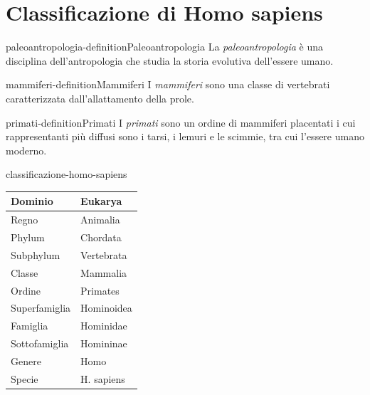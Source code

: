 \documentclass[preview]{standalone}
\begin{document}
\genpage

\section{Classificazione di Homo sapiens}

\begin{snippetdefinition}{paleoantropologia-definition}{Paleoantropologia}
    La \textit{paleoantropologia} è una disciplina dell'antropologia che studia la storia evolutiva
    dell'essere umano.
\end{snippetdefinition}

\begin{snippetdefinition}{mammiferi-definition}{Mammiferi}
    I \textit{mammiferi} sono una classe di vertebrati caratterizzata dall'allattamento della prole. 
\end{snippetdefinition}

\begin{snippetdefinition}{primati-definition}{Primati}
    I \textit{primati} sono un ordine di mammiferi placentati i cui rappresentanti
    più diffusi sono i tarsi, i lemuri e le scimmie, tra cui l'essere umano moderno. 
\end{snippetdefinition}


\begin{snippet}{classificazione-homo-sapiens}
    \vspace{0.25cm}
    \begin{center}
        \begin{tabular}{|l|l|}
            \hline Dominio & Eukarya \\
            \hline Regno & Animalia \\
            \hline Phylum & Chordata \\
            \hline Subphylum & Vertebrata \\
            \hline Classe & Mammalia \\
            \hline Ordine & Primates \\
            \hline Superfamiglia & Hominoidea \\
            \hline Famiglia & Hominidae \\
            \hline Sottofamiglia & Homininae \\
            \hline Genere & Homo \\
            \hline Specie & H. sapiens \\
            \hline
        \end{tabular}
    \end{center}
    \vspace{0.25cm}
\end{snippet}
\end{document}

